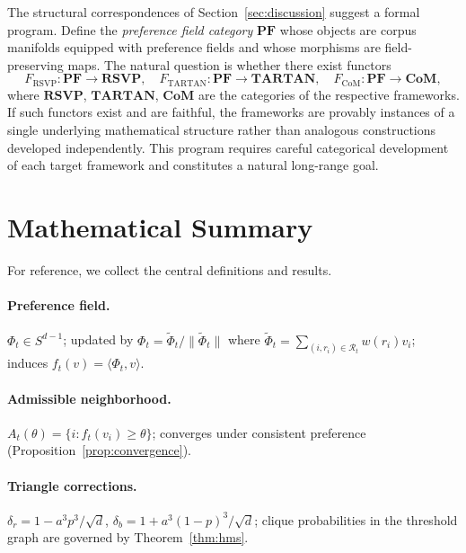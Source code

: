 \documentclass[12pt, a4paper]{article}
\theoremstyle{plain}
\theoremstyle{definition}
\begin{document}
The structural correspondences of Section~\ref{sec:discussion} suggest a
formal program. Define the \textit{preference field category} $\mathbf{PF}$
whose objects are corpus manifolds equipped with preference fields and whose
morphisms are field-preserving maps. The natural question is whether there
exist functors
\begin{equation}
  F_{\mathrm{RSVP}} : \mathbf{PF} \to \mathbf{RSVP}, \quad
  F_{\mathrm{TARTAN}} : \mathbf{PF} \to \mathbf{TARTAN}, \quad
  F_{\mathrm{CoM}} : \mathbf{PF} \to \mathbf{CoM},
\end{equation}
where $\mathbf{RSVP}$, $\mathbf{TARTAN}$, $\mathbf{CoM}$ are the
categories of the respective frameworks. If such functors exist and are
faithful, the frameworks are provably instances of a single underlying
mathematical structure rather than analogous constructions developed
independently. This program requires careful categorical development of
each target framework and constitutes a natural long-range goal.

\section{Mathematical Summary}
\label{sec:summary}

For reference, we collect the central definitions and results.

\paragraph{Preference field.} $\Phi_t \in S^{d-1}$; updated by
$\Phi_t = \tilde\Phi_t / \|\tilde\Phi_t\|$ where $\tilde\Phi_t = \sum_{(i,r_i) \in
\mathcal{R}_t} w(r_i) v_i$; induces $f_t(v) = \langle \Phi_t, v \rangle$.

\paragraph{Admissible neighborhood.} $A_t(\theta) = \{i : f_t(v_i) \ge \theta\}$;
converges under consistent preference (Proposition~\ref{prop:convergence}).

\paragraph{Triangle corrections.} $\delta_r = 1 - a^3 p^3 / \sqrt{d}$,
$\delta_b = 1 + a^3(1-p)^3/\sqrt{d}$; clique probabilities in the threshold
graph are governed by Theorem~\ref{thm:hms}.
\end{document}
